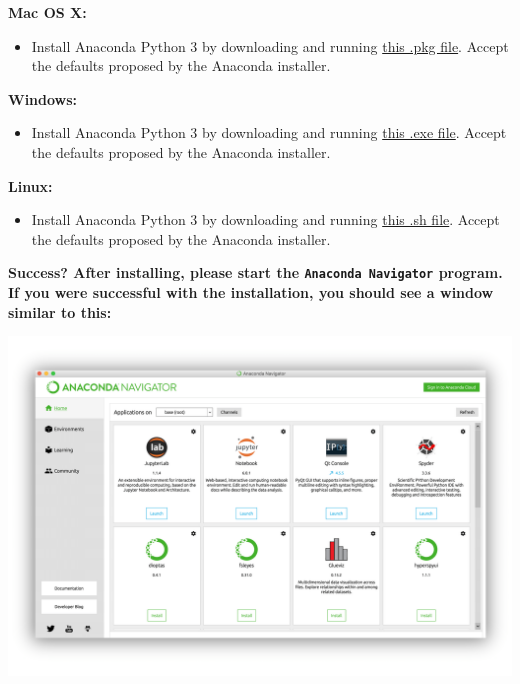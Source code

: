 \documentclass[
]{book}
\providecommand{\tightlist}{%
  \setlength{\itemsep}{0pt}\setlength{\parskip}{0pt}}
\begin{document}
\textbf{Mac OS X:}

\begin{itemize}
\tightlist
\item
  Install Anaconda Python 3 by downloading and running \href{https://repo.anaconda.com/archive/Anaconda3-2020.07-MacOSX-x86_64.pkg}{this .pkg file}. Accept the defaults proposed by the Anaconda installer.
\end{itemize}

\textbf{Windows:}

\begin{itemize}
\tightlist
\item
  Install Anaconda Python 3 by downloading and running \href{https://repo.anaconda.com/archive/Anaconda3-2020.07-Windows-x86_64.exe}{this .exe file}. Accept the defaults proposed by the Anaconda installer.
\end{itemize}

\textbf{Linux:}

\begin{itemize}
\tightlist
\item
  Install Anaconda Python 3 by downloading and running \href{https://repo.anaconda.com/archive/Anaconda3-2020.07-Linux-x86_64.sh}{this .sh file}. Accept the defaults proposed by the Anaconda installer.
\end{itemize}

\begin{alert}

\textbf{Success? After installing, please start the \texttt{Anaconda\ Navigator} program. If you were successful with the installation, you should see a window similar to this:}

\end{alert}

\includegraphics{Python/PythonInstall/images/Anaconda_navigator.png}
\end{document}
